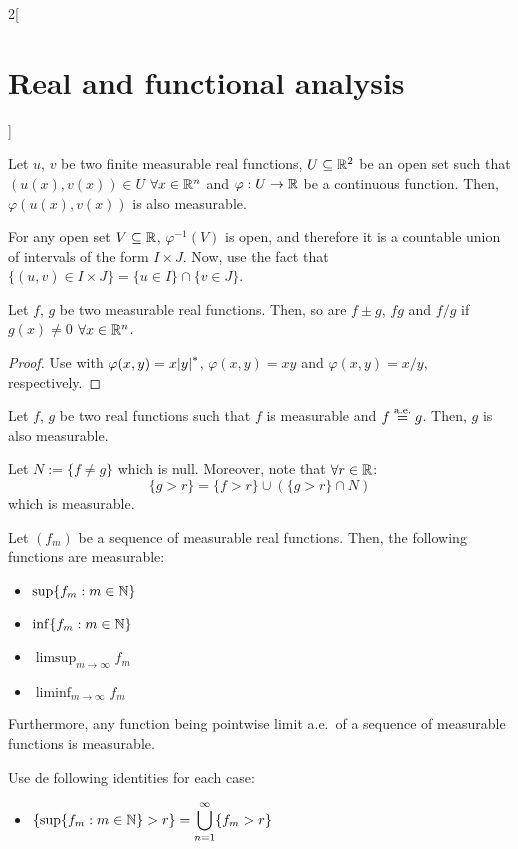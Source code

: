 \documentclass[../../../main_math.tex]{subfiles}
\begin{document}
\begin{multicols}{2}[\section{Real and functional analysis}]
\begin{proposition}
    Let $u$, $v$ be two finite measurable real functions, $U\subseteq\mathbb{R}^2$ be an open set such that $(u(x),v(x))\in U$ $\forall x\in\mathbb{R}^n$ and $\varphi:U\rightarrow\mathbb{R}$ be a continuous function. Then, $\varphi(u(x),v(x))$ is also measurable.
  \end{proposition}
  \begin{sproof}
    For any open set $V\subseteq\mathbb{R}$, $\varphi^{-1}(V)$ is open, and therefore it is a countable union of intervals of the form $I\times J$. Now, use the fact that $\{(u,v)\in I\times J\}=\{u\in I\}\cap\{v\in J\}$.
  \end{sproof}
  \begin{proposition}
    Let $f$, $g$ be two measurable real functions. Then, so are $f\pm g$, $fg$ and $f/g$ if $g(x)\ne 0$ $\forall x\in\mathbb{R}^n$.
  \end{proposition}
  \begin{proof}
    Use  with $\varphi(x,y)=x\om y$, $\varphi(x,y)=xy$ and $\varphi(x,y)=x/y$, respectively.
  \end{proof}
  \begin{proposition}
    Let $f$, $g$ be two real functions such that $f$ is measurable and $f\overset{\text{a.e.}}{=} g$. Then, $g$ is also measurable.
  \end{proposition}
  \begin{sproof}
    Let $N:=\{f\ne g\}$ which is null. Moreover, note that $\forall r\in\mathbb{R}$:
    $$\{g>r\}=\{f>r\} \cup (\{g>r\}\cap N)$$
    which is measurable.
  \end{sproof}
  \begin{proposition}
    Let $(f_m)$ be a sequence of measurable real functions. Then, the following functions are measurable:
    \begin{itemize}
      \item $\displaystyle\sup\{f_m:m\in\mathbb{N}\}$
      \item $\displaystyle\inf\{f_m:m\in\mathbb{N}\}$
      \item $\displaystyle\limsup_{m\to\infty} f_m$
      \item $\displaystyle\liminf_{m\to\infty} f_m$
    \end{itemize}
    Furthermore, any function being pointwise limit a.e.\ of a sequence of measurable functions is measurable.
  \end{proposition}
  \begin{sproof}
    Use de following identities for each case:
    \begin{itemize}
      \item $\displaystyle\{\sup\{f_m:m\in\mathbb{N}\}>r\}=\bigcup_{n=1}^\infty \{f_m> r\}$

\end{itemize}
\end{sproof}
\end{multicols}
\end{document}
